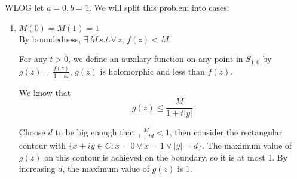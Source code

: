 \documentclass{homework}
\begin{document}
                                                                                              \begin{solution}
                                                                                              WLOG let $a=0, b=1$. We will split this problem into cases:
                                                                                              \begin{enumerate}
                                                                                                  \item $M(0) = M(1) = 1$\\
                                                                                                          By boundedness, $\exists\, M\, s.t. \forall\, z,\, f(z) < M.$
                                                                                                                  
                                                                                                                          For any $t>0$, we define an auxilary function on any point in $S_{1,0}$ by $g(z) = \frac{f(z)}{1 + tz}$. $g(z)$ is holomorphic and less than $f(z)$.
                                                                                                                                  
                                                                                                                                          We know that 
                                                                                                                                                  \[g(z) \leq \frac{M}{1 + t|y|}\]
                                                                                                                                                          
                                                                                                                                                                  Choose $d$ to be big enough that $\frac{M}{1+td} < 1$, then consider the rectangular contour with $\{x+iy\in C: x=0\lor x= 1\lor |y| = d\}.$ The maximum value of $g(z)$ on this contour is achieved on the boundary, so it is at most 1.    By increasing $d$, the maximum value of $g(z)$ is 1. 
                                                                                                                                                                          

\end{enumerate}
\end{solution}
\end{document}
